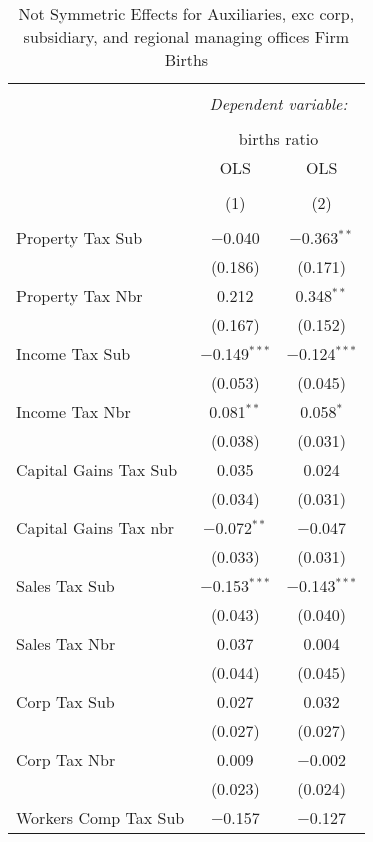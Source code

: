 
\begin{table}[!htbp] \centering 
  \caption{Not Symmetric Effects for  Auxiliaries, exc corp, subsidiary, and regional managing offices Firm Births} 
  \label{95noequality} 
\footnotesize 
\begin{tabular}{@{\extracolsep{5pt}}lcc} 
\\[-1.8ex]\hline 
\hline \\[-1.8ex] 
 & \multicolumn{2}{c}{\textit{Dependent variable:}} \\ 
\cline{2-3} 
\\[-1.8ex] & \multicolumn{2}{c}{births ratio} \\ 
 & OLS & OLS \\ 
\\[-1.8ex] & (1) & (2)\\ 
\hline \\[-1.8ex] 
 Property Tax Sub & $-$0.040 & $-$0.363$^{**}$ \\ 
  & (0.186) & (0.171) \\ 
  Property Tax Nbr & 0.212 & 0.348$^{**}$ \\ 
  & (0.167) & (0.152) \\ 
  Income Tax Sub & $-$0.149$^{***}$ & $-$0.124$^{***}$ \\ 
  & (0.053) & (0.045) \\ 
  Income Tax Nbr & 0.081$^{**}$ & 0.058$^{*}$ \\ 
  & (0.038) & (0.031) \\ 
  Capital Gains Tax Sub & 0.035 & 0.024 \\ 
  & (0.034) & (0.031) \\ 
  Capital Gains Tax nbr & $-$0.072$^{**}$ & $-$0.047 \\ 
  & (0.033) & (0.031) \\ 
  Sales Tax Sub & $-$0.153$^{***}$ & $-$0.143$^{***}$ \\ 
  & (0.043) & (0.040) \\ 
  Sales Tax Nbr & 0.037 & 0.004 \\ 
  & (0.044) & (0.045) \\ 
  Corp Tax Sub & 0.027 & 0.032 \\ 
  & (0.027) & (0.027) \\ 
  Corp Tax Nbr & 0.009 & $-$0.002 \\ 
  & (0.023) & (0.024) \\ 
  Workers Comp Tax Sub & $-$0.157 & $-$0.127 \\ 

\end{tabular}
\end{table}

